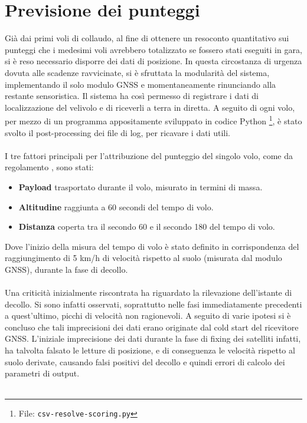 \documentclass[12pt]{article}
\begin{document}
\section{Previsione dei punteggi}
Già dai primi voli di collaudo, al fine di ottenere un resoconto quantitativo sui punteggi che i medesimi voli avrebbero totalizzato se fossero stati eseguiti in gara, si è reso necessario disporre dei dati di posizione. In questa circostanza di urgenza dovuta alle scadenze ravvicinate, si è sfruttata la modularità del sistema, implementando il solo modulo GNSS e momentaneamente rinunciando alla restante sensoristica. Il sistema ha così permesso di registrare i dati di localizzazione del velivolo e di riceverli a terra in diretta. A seguito di ogni volo, per mezzo di un programma appositamente sviluppato in codice Python \footnote{File: \texttt{csv-resolve-scoring.py}}, è stato svolto il post-processing dei file di log, per ricavare i dati utili.
\\\\
I tre fattori principali per l'attribuzione del punteggio del singolo volo, come da regolamento \cite{regulation}, sono stati:
\begin{itemize}
\item \textbf{Payload} trasportato durante il volo, misurato in termini di massa.
\item \textbf{Altitudine} raggiunta a 60 secondi del tempo di volo.
\item \textbf{Distanza} coperta tra il secondo 60 e il secondo 180 del tempo di volo.
\end{itemize}
Dove l'inizio della misura del tempo di volo è stato definito in corrispondenza del raggiungimento di 5 km/h di velocità rispetto al suolo (misurata dal modulo GNSS), durante la fase di decollo.
\\\\
Una criticità inizialmente riscontrata ha riguardato la rilevazione dell'istante di decollo. Si sono infatti osservati, soprattutto nelle fasi immediatamente precedenti a quest'ultimo, picchi di velocità non ragionevoli. A seguito di varie ipotesi si è concluso che tali imprecisioni dei dati erano originate dal cold start del ricevitore GNSS. L'iniziale imprecisione dei dati durante la fase di fixing dei satelliti infatti, ha talvolta falsato le letture di posizione, e di conseguenza le velocità rispetto al suolo derivate, causando falsi positivi del decollo e quindi errori di calcolo dei parametri di output. 
\\\\
\end{document}
